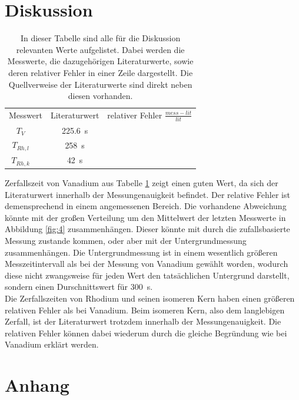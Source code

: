 \section{Diskussion}
\begin{table}
\centering
\caption{In dieser Tabelle sind alle für die Diskussion relevanten Werte aufgelistet. 
Dabei werden die Messwerte, die dazugehörigen Literaturwerte, sowie deren relativer Fehler
in einer Zeile dargestellt. Die Quellverweise der Literaturwerte sind direkt neben diesen vorhanden.
}
\label{tab:3}
\begin{tabular}[H]{c c c c}
    \toprule
    \multicolumn{2}{c}{Messwert} & \multicolumn{1}{c}{Literaturwert } & \multicolumn{1}{c}{relativer Fehler $\frac{mess-lit}{lit} $ }\\
    \cmidrule(lr){1-4}
      $T_{V} $   &   & \SI{225.6}{\second}\cite{szabo1986determination}  &  \\
      $T_{Rh,l} $   &   & \SI{258}{\second} \cite{flammersfeld1946isomere}  &  \\
      $T_{Rh,k} $   &   & \SI{42}{\second} \cite{flammersfeld1946isomere}  &  \\
    \bottomrule
\end{tabular}
\end{table}

\justifying Zerfallszeit von Vanadium aus Tabelle \ref{tab:3}  zeigt einen guten Wert, da sich der Literaturwert innerhalb der
Messungenauigkeit befindet. Der relative Fehler ist demensprechend in einem angemessenen Bereich.
Die vorhandene Abweichung könnte mit der großen Verteilung um den Mittelwert der letzten Messwerte in Abbildung \ref{fig:4}
zusammenhängen. Dieser könnte mit durch die zufallsbasierte Messung zustande kommen, oder aber mit 
der Untergrundmessung zusammenhängen. Die Untergrundmessung ist in einem wesentlich größeren Messzeitintervall
als bei der Messung von Vanadium gewählt worden, wodurch diese nicht zwangsweise für jeden Wert den tatsächlichen Untergrund darstellt,
sondern einen Durschnittswert für \SI{300}{\second}.\\
Die Zerfallszeiten von Rhodium und seinen isomeren Kern haben  einen größeren 
relativen Fehler als bei Vanadium. Beim isomeren Kern, also dem langlebigen Zerfall, ist der Literaturwert 
trotzdem innerhalb der Messungenauigkeit. Die relativen Fehler können dabei wiederum durch die gleiche Begründung wie
bei Vanadium erklärt werden. 


\newpage
\printbibliography
\newpage
\section*{Anhang}

\newpage

